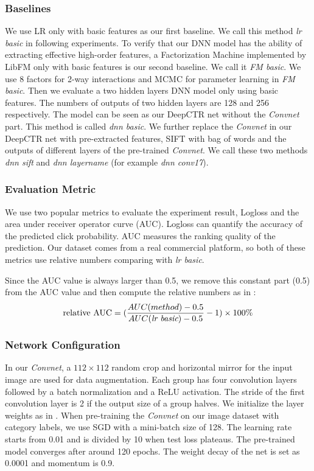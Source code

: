 \documentclass{sig-alternate}
\begin{document}
\subsubsection{Baselines}
We use LR only with basic features as our first baseline. We call this method \emph{lr basic} in following experiments. To verify that our DNN model has the ability of extracting effective high-order features,  a Factorization Machine implemented by LibFM \cite{rendle2012factorization}  only with basic features is our second baseline.  We call it \emph{FM basic}. We use 8 factors for 2-way interactions and MCMC for parameter learning in \emph{FM basic}. Then we  evaluate a two hidden layers DNN model only using basic features. The numbers of outputs of two hidden layers  are 128 and 256 respectively. The model can be seen as our DeepCTR net without the \emph{Convnet} part. This method is called \emph{dnn basic}. We further replace the \emph{Convnet} in our DeepCTR net with pre-extracted features, SIFT \cite{lowe1999object} with bag of words and the outputs of different layers of the pre-trained  \emph{Convnet}. We call these two methods \emph{dnn sift} and \emph{dnn layername} (for example \emph{dnn conv17}). 
\subsubsection{Evaluation Metric}
We use two popular metrics to evaluate the experiment result, Logloss and the area under receiver operator curve (AUC).  Logloss can quantify the accuracy of the predicted click probability. AUC measures the ranking quality of the prediction. Our dataset comes from a real commercial platform, so both of these metrics use relative numbers comparing with \emph{lr basic}. 

Since the AUC value is always larger than 0.5, we remove this constant part (0.5) from the AUC value and then compute the relative numbers as in \cite{yan2014coupled}:
\begin{equation}
\text{relative AUC} = (\frac{AUC(method) - 0.5}{AUC(\emph{lr basic})-0.5}-1) \times 100\% 
\end{equation}  
\subsubsection{Network Configuration}
In our \emph{Convnet},  a $112 \times 112$ random crop  and horizontal mirror for the input image are used for data augmentation. Each group has four convolution layers followed by a batch normalization \cite{ioffe2015batch} and a ReLU \cite{nair2010rectified} activation. The stride of the first convolution layer is 2 if the output size of a group halves.  We initialize the layer weights as in  \cite{he2015delving}. When pre-training the \emph{Convnet} on our image dataset with category labels,  we use SGD with a mini-batch size of 128. The learning rate starts from 0.01 and is divided by 10 when test loss plateaus. The pre-trained model converges after around 120 epochs. The weight decay of the net is set as 0.0001 and momentum is 0.9. 
\end{document}
